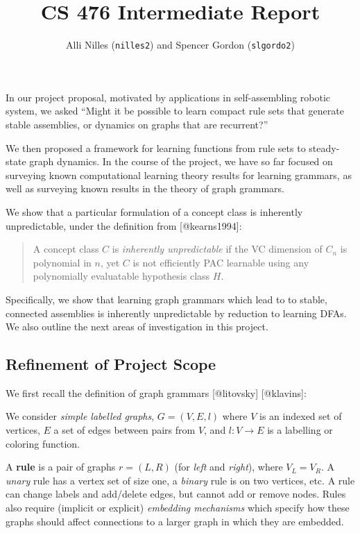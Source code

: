 \documentclass[]{article}
\title{CS 476 Intermediate Report}
\author{Alli Nilles (\texttt{nilles2}) and Spencer Gordon (\texttt{slgordo2})}
\date{}
\begin{document}
\maketitle

\newcommand{\step}[1]{\xrightarrow{#1}}
\newcommand{\steps}[1]{\xRightarrow{#1}}

In our project proposal, motivated by applications in self-assembling
robotic system, we asked ``Might it be possible to learn compact rule
sets that generate stable assemblies, or dynamics on graphs that are
recurrent?''

We then proposed a framework for learning functions from rule sets to
steady-state graph dynamics. In the course of the project, we have so
far focused on surveying known computational learning theory results for
learning grammars, as well as surveying known results in the theory of
graph grammars.

We show that a particular formulation of a concept class is inherently
unpredictable, under the definition from {[}@kearns1994{]}:

\begin{quote}
A concept class \(C\) is \emph{inherently unpredictable} if the VC
dimension of \(C_n\) is polynomial in \(n\), yet \(C\) is not
efficiently PAC learnable using any polynomially evaluatable hypothesis
class \(H\).
\end{quote}

Specifically, we show that learning graph grammars which lead to to
stable, connected assemblies is inherently unpredictable by reduction to
learning DFAs. We also outline the next areas of investigation in this
project.

\subsection{Refinement of Project
Scope}\label{refinement-of-project-scope}

We first recall the definition of graph grammars {[}@litovsky{]}
{[}@klavins{]}:

We consider \emph{simple labelled graphs}, \(G = (V,E,l)\) where \(V\)
is an indexed set of vertices, \(E\) a set of edges between pairs from
\(V\), and \(l: V \to E\) is a labelling or coloring function.

A \textbf{rule} is a pair of graphs \(r=(L,R)\) (for \emph{left} and
\emph{right}), where \(V_L = V_R\). A \emph{unary} rule has a vertex set
of size one, a \emph{binary} rule is on two vertices, etc. A rule can
change labels and add/delete edges, but cannot add or remove nodes.
Rules also require (implicit or explicit) \emph{embedding mechanisms}
which specify how these graphs should affect connections to a larger
graph in which they are embedded.
\end{document}
